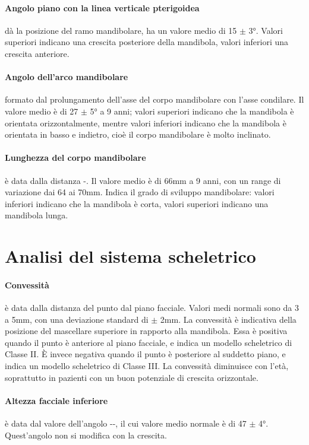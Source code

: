 \paragraph{Angolo piano  con la linea verticale pterigoidea} dà la posizione del ramo mandibolare, ha un valore medio di 15 $\pm$ 3°. Valori superiori indicano una crescita posteriore della mandibola, valori inferiori una crescita anteriore.

\paragraph{Angolo dell'arco mandibolare} formato dal prolungamento dell'asse del corpo mandibolare con l'asse condilare. Il valore medio è di 27 $\pm$ 5° a 9 anni; valori superiori indicano che la mandibola è orientata orizzontalmente, mentre valori inferiori indicano che la mandibola è orientata in basso e indietro, cioè il corpo mandibolare è molto inclinato.

\paragraph{Lunghezza del corpo mandibolare} è data dalla distanza -. Il valore medio è di 66mm a 9 anni, con un range di variazione dai 64 ai 70mm. Indica il grado di sviluppo mandibolare: valori inferiori indicano che la mandibola è corta, valori superiori indicano una mandibola lunga.

\section{Analisi del sistema scheletrico}
\paragraph{Convessità} è data dalla distanza del punto  dal piano facciale. Valori medi normali sono da 3 a 5mm, con una deviazione standard di $\pm$ 2mm. La convessità è indicativa della posizione del mascellare superiore in rapporto alla mandibola. Essa è positiva quando il punto  è anteriore al piano facciale, e indica un modello scheletrico di Classe II. È invece negativa quando il punto  è posteriore al suddetto piano, e indica un modello scheletrico di Classe III. La convessità diminuisce con l'età, soprattutto in pazienti con un buon potenziale di crescita orizzontale.

\paragraph{Altezza facciale inferiore} è data dal valore dell'angolo --, il cui valore medio normale è di 47 $\pm$ 4°. Quest'angolo non si modifica con la crescita.

